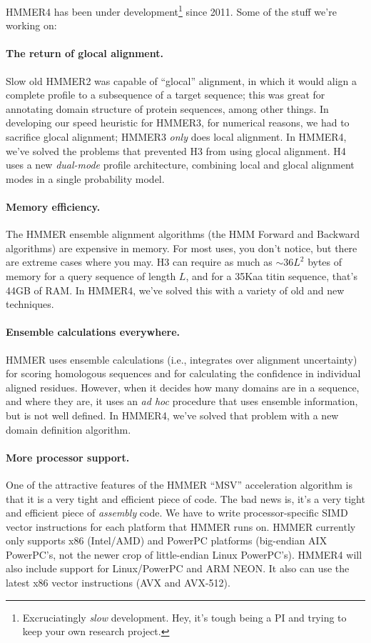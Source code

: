 HMMER4 has been under development\footnote{Excruciatingly \emph{slow}
  development. Hey, it's tough being a PI and trying to keep your own
  research project.} since 2011. Some of the stuff we're working on:

\paragraph{The return of glocal alignment.} Slow old HMMER2 was
 capable of ``glocal'' alignment, in which it would align a complete
 profile to a subsequence of a target sequence; this was great for
 annotating domain structure of protein sequences, among other things.
 In developing our speed heuristic for HMMER3, for numerical reasons,
 we had to sacrifice glocal alignment; HMMER3 \emph{only} does local
alignment. In HMMER4, we've solved the problems that prevented H3 from
using glocal alignment. H4 uses a new \emph{dual-mode} profile
architecture, combining local and glocal alignment modes in a single
probability model.

\paragraph{Memory efficiency.} The HMMER ensemble alignment
algorithms (the HMM Forward and Backward algorithms) are expensive in
memory. For most uses, you don't notice, but there are extreme cases
where you may. H3 can require as much as $\sim 36L^2$ bytes of memory
for a query sequence of length $L$, and for a 35Kaa titin sequence,
that's 44GB of RAM. In HMMER4, we've solved this with a variety of old
and new techniques.

\paragraph{Ensemble calculations everywhere.} HMMER uses ensemble
calculations (i.e., integrates over alignment uncertainty) for scoring
homologous sequences and for calculating the confidence in individual
aligned residues. However, when it decides how many domains are in a
sequence, and where they are, it uses an \emph{ad hoc} procedure that
uses ensemble information, but is not well defined. In HMMER4, we've
solved that problem with a new domain definition algorithm.

\paragraph{More processor support.} One of the attractive features of the
HMMER ``MSV'' acceleration algorithm is that it is a very tight and
efficient piece of code. The bad news is, it's a very tight and
efficient piece of \emph{assembly} code. We have to write
processor-specific SIMD vector instructions for each platform that
HMMER runs on. HMMER currently only supports x86 (Intel/AMD) and
PowerPC platforms (big-endian AIX PowerPC's, not the newer crop of
little-endian Linux PowerPC's). HMMER4 will also include support for
Linux/PowerPC and ARM NEON. It also can use the latest x86 vector
instructions (AVX and AVX-512).

